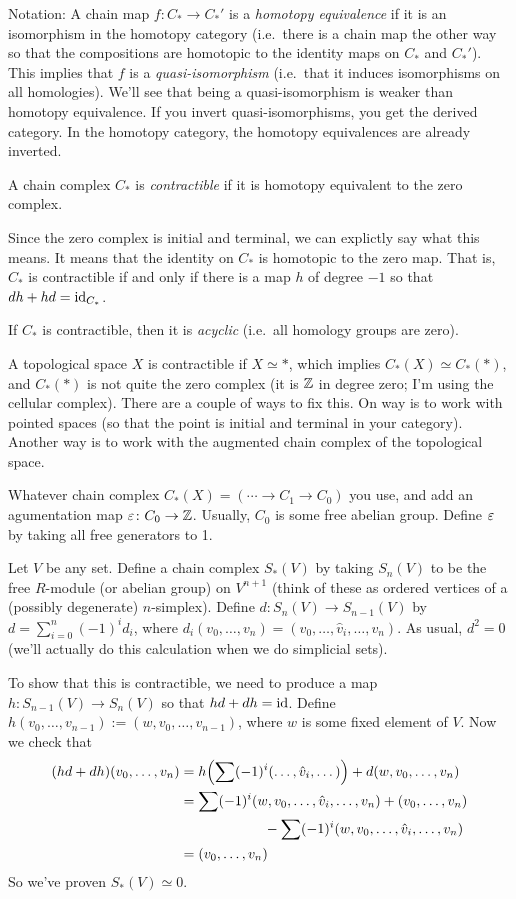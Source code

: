 Notation: A chain map $f\colon C_*\to C_*'$ is a \emph{homotopy equivalence} if it is an isomorphism in the homotopy category (i.e.~there is a chain map the other way so that the compositions are homotopic to the identity maps on $C_*$ and $C_*'$). This implies that $f$ is a \emph{quasi-isomorphism} (i.e.~that it induces isomorphisms on all homologies). We'll see that being a quasi-isomorphism is weaker than homotopy equivalence. If you invert quasi-isomorphisms, you get the derived category. In the homotopy category, the homotopy equivalences are already inverted.
\begin{definition}
 A chain complex $C_*$ is \emph{contractible} if it is homotopy equivalent to the zero complex.
\end{definition}
Since the zero complex is initial and terminal, we can explictly say what this means. It means that the identity on $C_*$ is homotopic to the zero map. That is, $C_*$ is contractible if and only if there is a map $h$ of degree $-1$ so that $dh+hd=\operatorname{id}_{C_*}$.
\begin{lemma}
 If $C_*$ is contractible, then it is \emph{acyclic} (i.e.~all homology groups are zero).
\end{lemma}
\begin{warning}
 A topological space $X$ is contractible if $X\simeq *$, which implies $C_*(X)\simeq C_*(*)$, and $C_*(*)$ is not quite the zero complex (it is $\mathbb{Z}$ in degree zero; I'm using the cellular complex). There are a couple of ways to fix this. On way is to work with pointed spaces (so that the point is initial and terminal in your category). Another way is to work with the augmented chain complex of the topological space.
 
 Whatever chain complex $C_*(X)=(\cdots \to C_1\to C_0)$ you use, and add an agumentation map $\varepsilon\colon C_0\to \mathbb{Z}$. Usually, $C_0$ is some free abelian group. Define $\varepsilon$ by taking all free generators to 1.
\end{warning}
\begin{example}
 Let $V$ be any set. Define a chain complex $S_*(V)$ by taking $S_n(V)$ to be the free $R$-module (or abelian group) on $V^{n+1}$ (think of these as ordered vertices of a (possibly degenerate) $n$-simplex). Define $d\colon S_n(V)\to S_{n-1}(V)$ by $d=\sum_{i=0}^n (-1)^i d_i$, where $d_i(v_0,\dots, v_n)=(v_0,\dots, \hat v_i,\dots, v_n)$. As usual, $d^2=0$ (we'll actually do this calculation when we do simplicial sets).
 
 To show that this is contractible, we need to produce a map $h\colon S_{n-1}(V)\to S_n(V)$ so that $hd+dh=\operatorname{id}$. Define $h(v_0,\dots, v_{n-1}):= (w,v_0,\dots, v_{n-1})$, where $w$ is some fixed element of $V$. Now we check that
 \begin{align*}
  (hd+dh)(v_0,\dots, v_n) &= h\Bigl(\sum (-1)^i (\dots,\hat v_i,\dots)  \Bigr) + d(w,v_0,\dots, v_n)\\
  &= \sum (-1)^i (w,v_0,\dots, \hat v_i,\dots, v_n) + (v_0,\dots, v_n) \\
  & \qquad \qquad\qquad - \sum (-1)^i (w,v_0,\dots, \hat v_i,\dots, v_n)\\
  &= (v_0,\dots, v_n)
 \end{align*}
 So we've proven $S_*(V)\simeq 0$.
\end{example}
